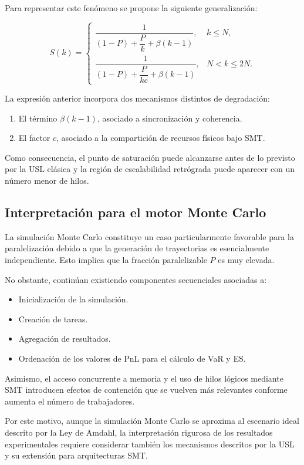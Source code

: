 \documentclass[11pt]{article}
\begin{document}
Para representar este fenómeno se propone la siguiente generalización:

\begin{equation}
S(k)=
\begin{cases}
\dfrac{1}
{(1-P)+\dfrac{P}{k}+\beta(k-1)},
&
k\le N,
\\[1em]
\dfrac{1}
{(1-P)+\dfrac{P}{kc}+\beta(k-1)},
&
N<k\le2N.
\end{cases}
\label{eq:smt_model}
\end{equation}

La expresión anterior incorpora dos mecanismos distintos de degradación:

\begin{enumerate}
\item El término \(\beta(k-1)\), asociado a sincronización y coherencia.
\item El factor \(c\), asociado a la compartición de recursos físicos bajo SMT.
\end{enumerate}

Como consecuencia, el punto de saturación puede alcanzarse antes de lo previsto por la USL clásica y la región de escalabilidad retrógrada puede aparecer con un número menor de hilos.

\subsection{Interpretación para el motor Monte Carlo}

La simulación Monte Carlo constituye un caso particularmente favorable para la paralelización debido a que la generación de trayectorias es esencialmente independiente. Esto implica que la fracción paralelizable \(P\) es muy elevada.

No obstante, continúan existiendo componentes secuenciales asociadas a:

\begin{itemize}
\item Inicialización de la simulación.
\item Creación de tareas.
\item Agregación de resultados.
\item Ordenación de los valores de PnL para el cálculo de VaR y ES.
\end{itemize}

Asimismo, el acceso concurrente a memoria y el uso de hilos lógicos mediante SMT introducen efectos de contención que se vuelven más relevantes conforme aumenta el número de trabajadores.

Por este motivo, aunque la simulación Monte Carlo se aproxima al escenario ideal descrito por la Ley de Amdahl, la interpretación rigurosa de los resultados experimentales requiere considerar también los mecanismos descritos por la USL y su extensión para arquitecturas SMT.


\clearpage

\end{document}
